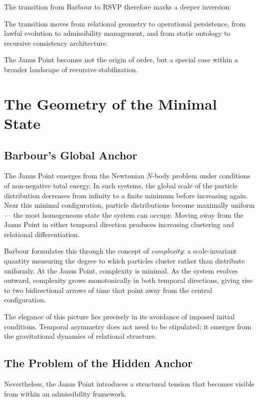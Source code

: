 \documentclass[12pt, a4paper]{article}
\begin{document}
The transition from Barbour to RSVP therefore marks a deeper inversion:

The transition moves from relational geometry to operational persistence,
from lawful evolution to admissibility management, and from static ontology
to recursive consistency architecture.

The Janus Point becomes not the origin of order, but a special case within a
broader landscape of recursive stabilization.

\section{The Geometry of the Minimal State}

\subsection{Barbour's Global Anchor}

The Janus Point emerges from the Newtonian \(N\)-body problem under conditions
of non-negative total energy. In such systems, the global scale of the
particle distribution decreases from infinity to a finite minimum before
increasing again. Near this minimal configuration, particle distributions
become maximally uniform — the most homogeneous state the system can occupy.
Moving away from the Janus Point in either temporal direction produces
increasing clustering and relational differentiation.

Barbour formulates this through the concept of \emph{complexity}: a
scale-invariant quantity measuring the degree to which particles cluster
rather than distribute uniformly. At the Janus Point, complexity is minimal.
As the system evolves outward, complexity grows monotonically in both
temporal directions, giving rise to two bidirectional arrows of time that
point away from the central configuration.

The elegance of this picture lies precisely in its avoidance of imposed
initial conditions. Temporal asymmetry does not need to be stipulated; it
emerges from the gravitational dynamics of relational structure.

\subsection{The Problem of the Hidden Anchor}

Nevertheless, the Janus Point introduces a structural tension that becomes
visible from within an admissibility framework.
\end{document}

